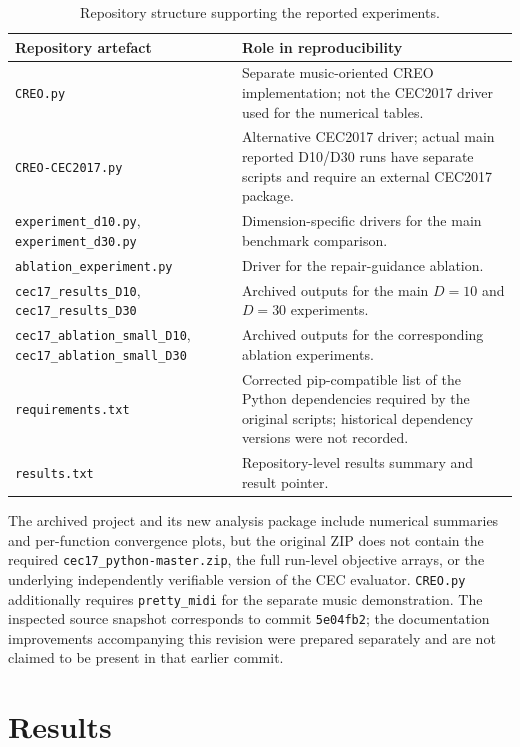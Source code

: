 \documentclass[a4paper,fleqn]{cas-sc}
\begin{document}
\begin{table}[t]
\centering
\caption{Repository structure supporting the reported experiments.}
\label{tab:repo}
\small
\begin{tabular}{p{} p{}}
\toprule
\textbf{Repository artefact} & \textbf{Role in reproducibility}\\
\midrule
\texttt{CREO.py} & Separate music-oriented CREO implementation; not the CEC2017 driver used for the numerical tables.\\
\texttt{CREO-CEC2017.py} & Alternative CEC2017 driver; actual main reported D10/D30 runs have separate scripts and require an external CEC2017 package.\\
\texttt{experiment\_d10.py}, \texttt{experiment\_d30.py} & Dimension-specific drivers for the main benchmark comparison.\\
\texttt{ablation\_experiment.py} & Driver for the repair-guidance ablation.\\
\texttt{cec17\_results\_D10}, \texttt{cec17\_results\_D30} & Archived outputs for the main $D=10$ and $D=30$ experiments.\\
\texttt{cec17\_ablation\_small\_D10}, \texttt{cec17\_ablation\_small\_D30} & Archived outputs for the corresponding ablation experiments.\\
\texttt{requirements.txt} & Corrected pip-compatible list of the Python dependencies required by the original scripts; historical dependency versions were not recorded.\\
\texttt{results.txt} & Repository-level results summary and result pointer.\\
\bottomrule
\end{tabular}
\end{table}

The archived project and its new analysis package include numerical summaries and per-function convergence plots, but the original ZIP does not contain the required \texttt{cec17\_python-master.zip}, the full run-level objective arrays, or the underlying independently verifiable version of the CEC evaluator. \texttt{CREO.py} additionally requires \texttt{pretty\_midi} for the separate music demonstration. The inspected source snapshot corresponds to commit \texttt{5e04fb2}; the documentation improvements accompanying this revision were prepared separately and are not claimed to be present in that earlier commit.

\section{Results}
\end{document}
